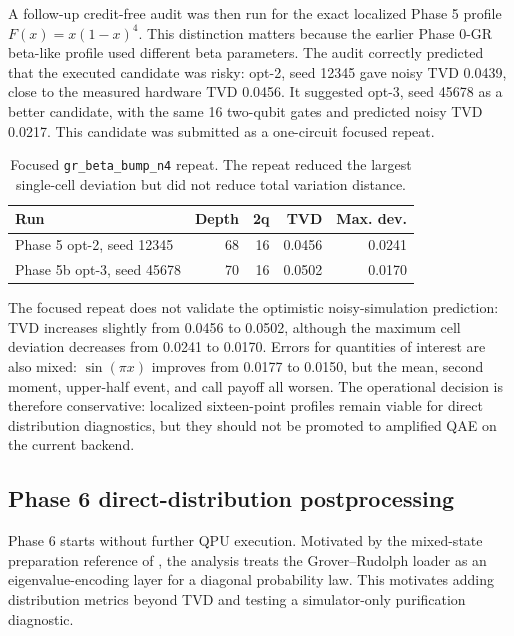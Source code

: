 A follow-up credit-free audit was then run for the exact localized Phase 5
profile \(F(x)=x(1-x)^4\). This distinction matters because the earlier
Phase 0-GR beta-like profile used different beta parameters. The audit correctly
predicted that the executed candidate was risky: opt-2, seed 12345 gave noisy
TVD 0.0439, close to the measured hardware TVD 0.0456. It suggested opt-3,
seed 45678 as a better candidate, with the same 16 two-qubit gates and predicted
noisy TVD 0.0217. This candidate was submitted as a one-circuit focused repeat.

\begin{table}[h]
\centering
\begin{tabular}{lrrrr}
\toprule
Run & Depth & 2q & TVD & Max. dev. \\
\midrule
Phase 5 opt-2, seed 12345 & 68 & 16 & 0.0456 & 0.0241 \\
Phase 5b opt-3, seed 45678 & 70 & 16 & 0.0502 & 0.0170 \\
\bottomrule
\end{tabular}
\caption{Focused \texttt{gr\_beta\_bump\_n4} repeat. The repeat reduced the
largest single-cell deviation but did not reduce total variation distance.}
\label{tab:phase5b-beta-repeat}
\end{table}

The focused repeat does not validate the optimistic noisy-simulation prediction:
TVD increases slightly from 0.0456 to 0.0502, although the maximum cell
deviation decreases from 0.0241 to 0.0170. Errors for quantities of interest
are also mixed:
\(\sin(\pi x)\) improves from 0.0177 to 0.0150, but the mean, second moment,
upper-half event, and call payoff all worsen. The operational decision is
therefore conservative: localized sixteen-point profiles remain viable for
direct distribution diagnostics, but they should not be promoted to amplified
QAE on the current backend.

\subsection{Phase 6 direct-distribution postprocessing}

Phase 6 starts without further QPU execution. Motivated by the mixed-state
preparation reference of \cite{friedrich2026mixedstate}, the analysis treats the
Grover--Rudolph loader as an eigenvalue-encoding layer for a diagonal
probability law. This motivates adding distribution metrics beyond TVD and
testing a simulator-only purification diagnostic.

